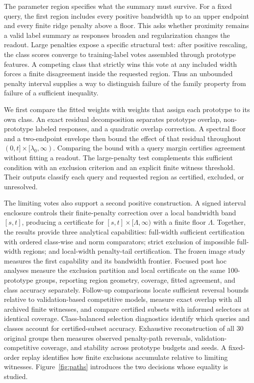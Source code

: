 \documentclass[preprint,12pt,authoryear]{elsarticle}
\begin{document}
The parameter region specifies what the summary must survive. For a fixed query, the first region includes every positive bandwidth up to an upper endpoint and every finite ridge penalty above a floor. This asks whether proximity remains a valid label summary as responses broaden and regularization changes the readout. Large penalties expose a specific structural test: after positive rescaling, the class scores converge to training-label votes assembled through prototype features. A competing class that strictly wins this vote at any included width forces a finite disagreement inside the requested region. Thus an unbounded penalty interval supplies a way to distinguish failure of the family property from failure of a sufficient inequality.

We first compare the fitted weights with weights that assign each prototype to its own class. An exact residual decomposition separates prototype overlap, non-prototype labeled responses, and a quadratic overlap correction. A spectral floor and a two-endpoint envelope then bound the effect of that residual throughout $(0,t]\times[\lambda_0,\infty)$. Comparing the bound with a query margin certifies agreement without fitting a readout. The large-penalty test complements this sufficient condition with an exclusion criterion and an explicit finite witness threshold. Their outputs classify each query and requested region as certified, excluded, or unresolved.

The limiting votes also support a second positive construction. A signed interval enclosure controls their finite-penalty correction over a local bandwidth band $[s,t]$, producing a certificate for $[s,t]\times[\Lambda,\infty)$ with a finite floor $\Lambda$. Together, the results provide three analytical capabilities: full-width sufficient certification with ordered class-wise and norm comparators; strict exclusion of impossible full-width regions; and local-width penalty-tail certification. The frozen image study measures the first capability and its bandwidth frontier. Focused post hoc analyses measure the exclusion partition and local certificate on the same 100-prototype groups, reporting region geometry, coverage, fitted agreement, and class accuracy separately. Follow-up comparisons locate sufficient reversal bounds relative to validation-based competitive models, measure exact overlap with all archived finite witnesses, and compare certified subsets with informed selectors at identical coverage. Class-balanced selection diagnostics identify which queries and classes account for certified-subset accuracy. Exhaustive reconstruction of all 30 original groups then measures observed penalty-path reversals, validation-competitive coverage, and stability across prototype budgets and seeds. A fixed-order replay identifies how finite exclusions accumulate relative to limiting witnesses. Figure~\ref{fig:paths} introduces the two decisions whose equality is studied.
\end{document}
